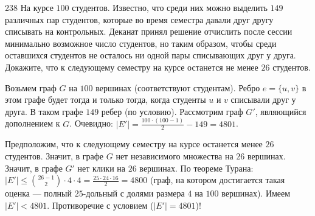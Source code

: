 \begin{task}{238}
На курсе $100$ студентов. Известно, что среди них можно выделить 
$149$ различных пар студентов, которые во время семестра давали друг другу списывать на контрольных. Деканат принял решение отчислить после сессии минимально возможное число студентов, но таким образом, чтобы среди оставшихся студентов не осталось ни одной пары списывающих друг у друга. Докажите, что к следующему семестру на курсе останется не менее $26$ студентов.
\end{task}

\begin{solution}
Возьмем граф $G$ на $100$ вершинах (соответствуют студентам). Ребро $e = \{u, v\}$ в этом графе будет тогда и только тогда, когда студенты $u$ и $v$ списывали друг у друга. В таком графе $149$ ребер (по условию). Рассмотрим граф $G'$, являющийся дополнением к $G$. Очевидно: $|E'| = \frac{100\cdot(100 - 1)}{2} - 149 = 4801$.\par
Предположим, что к следующему семестру на курсе останется менее  $26$ студентов. Значит, в графе $G$ нет независимого множества на $26$ вершинах. Значит, в графе $G'$ нет клики на $26$ вершинах. По теореме Турана: $|E'| \leq \binom{26 - 1}{2} \cdot4\cdot4 = \frac{25\cdot24\cdot16}{2} = 4800$ (граф, на котором достигается такая оценка --- полный $25$-дольный с долями размера $4$ на $100$ вершинах). Имеем $|E'| < 4801$. Противоречие с условием ($|E'| = 4801$)!
\end{solution}